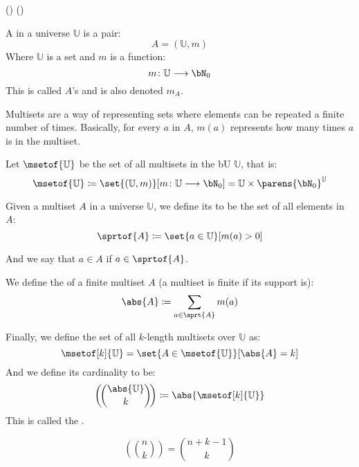 ({})
({})
\def\bU{\mathbb{U}}
\def\msetcoeff#1#2{\left(\!\binom{#1}{#2}\!\right)}

\begin{defn*}

	A  in a universe $\bU$ is a pair:
	\[ A=(\bU, m) \]
	Where $\bU$ is a set and $m$ is a function:
	\[ m\colon \bU\longrightarrow\bN_0 \]
	This is called $A$'s  and is also denoted $m_A$.
	
	Multisets are a way of representing sets where elements can be repeated a finite number of times.
	Basically, for every $a$ in $A$, $m(a)$ represents how many times $a$ is in the multiset.

	Let $\msetof{\bU}$ be the set of all multisets in the bU $\bU$, that is:
	\[ \msetof{\bU}\coloneqq\set{(\bU, m)}[m\colon \bU\longrightarrow\bN_0] = \bU\times\parens{\bN_0}^\bU \]

	Given a multiset $A$ in a universe $\bU$, we define its  to be the set of all elements in $A$:
	\[ \sprtof{A}\coloneqq\set{a\in\bU}[m(a)>0] \]

	And we say that $a\in A$ if $a\in\sprtof{A}$.

	We define the  of a finite multiset $A$ (a multiset is finite if its support is):
	\[ \abs{A}\coloneqq\sum_{a\in\sprt{A}}m(a) \]

	Finally, we define the set of all $k$-length multisets over $\bU$ as:
	\[ \msetof[k]{\bU} = \set{A\in\msetof{\bU}}[\abs{A}=k] \]
	And we define its cardinality to be:
	\[ \msetcoeff{\abs{\bU}}{k}\coloneqq\abs{\msetof[k]{\bU}} \]
	This is called the .

\end{defn*}

\begin{prop*}

	\[ \msetcoeff{n}{k} = \binom{n+k-1}{k} \]

\end{prop*}

